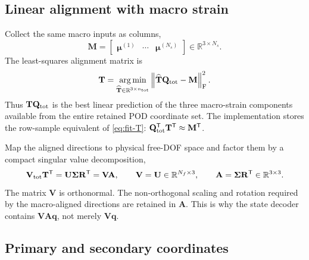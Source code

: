 \documentclass[11pt,a4paper]{article}
\newcommand{\R}{\mathbb{R}}
\newcommand{\transpose}{^{\mathsf T}}
\newcommand{\frobnorm}[1]{\left\lVert #1 \right\rVert_{\mathrm F}}
\newcommand{\vect}[1]{\mathbf{#1}}
\newcommand{\mat}[1]{\mathbf{#1}}
\begin{document}
\subsection{Linear alignment with macro strain}

Collect the same macro inputs as columns,
\begin{equation}
  \mat M
  = \begin{bmatrix}
    \vect\mu^{(1)} & \cdots & \vect\mu^{(N_s)}
  \end{bmatrix}
  \in\R^{3\times N_s}.
  \label{eq:macro-snapshot-matrix}
\end{equation}
The least-squares alignment matrix is
\begin{equation}
  \mat T
  = \underset{\widehat{\mat T}\in\R^{3\times n_{\rm tot}}}
            {\operatorname*{arg\,min}}
      \frobnorm{\widehat{\mat T}\mat Q_{\rm tot}-\mat M}^{2}.
  \label{eq:fit-T}
\end{equation}
Thus \(\mat T\mat Q_{\rm tot}\) is the best linear prediction of the three
macro-strain components available from the entire retained POD coordinate
set.  The implementation stores the row-sample equivalent of
\cref{eq:fit-T}: \(\mat Q_{\rm tot}\transpose\mat T\transpose\approx
\mat M\transpose\).

Map the aligned directions to physical free-DOF space and factor them by a
compact singular value decomposition,
\begin{equation}
  \mat V_{\rm tot}\mat T\transpose
  = \mat U\mat\Sigma\mat R\transpose
  = \mat V\mat A,
  \qquad
  \mat V=\mat U\in\R^{N_f\times3},
  \qquad
  \mat A=\mat\Sigma\mat R\transpose\in\R^{3\times3}.
  \label{eq:VA-factorization}
\end{equation}
The matrix \(\mat V\) is orthonormal.  The non-orthogonal scaling and
rotation required by the macro-aligned directions are retained in \(\mat A\).
This is why the state decoder contains \(\mat V\mat A\vect q\), not merely
\(\mat V\vect q\).

\subsection{Primary and secondary coordinates}
\end{document}
